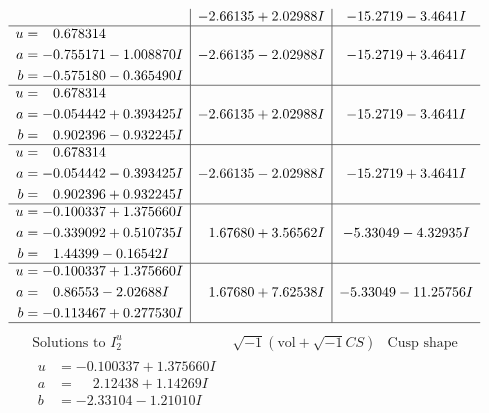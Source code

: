 \documentclass[1p]{elsarticle_modified}
\theoremstyle{definition}
\newcommand{\I}{\sqrt{-1}}
\begin{document}
$$\begin{array}{c|c|c}
 & -2.66135 + 2.02988 I & -15.2719 - 3.4641 I \\ \hline\begin{aligned}
u &= \phantom{-}0.678314\phantom{ +0.000000I} \\
a &= -0.755171 - 1.008870 I \\
b &= -0.575180 - 0.365490 I\end{aligned}
 & -2.66135 - 2.02988 I & -15.2719 + 3.4641 I \\ \hline\begin{aligned}
u &= \phantom{-}0.678314\phantom{ +0.000000I} \\
a &= -0.054442 + 0.393425 I \\
b &= \phantom{-}0.902396 - 0.932245 I\end{aligned}
 & -2.66135 + 2.02988 I & -15.2719 - 3.4641 I \\ \hline\begin{aligned}
u &= \phantom{-}0.678314\phantom{ +0.000000I} \\
a &= -0.054442 - 0.393425 I \\
b &= \phantom{-}0.902396 + 0.932245 I\end{aligned}
 & -2.66135 - 2.02988 I & -15.2719 + 3.4641 I \\ \hline\begin{aligned}
u &= -0.100337 + 1.375660 I \\
a &= -0.339092 + 0.510735 I \\
b &= \phantom{-}1.44399 - 0.16542 I\end{aligned}
 & \phantom{-}1.67680 + 3.56562 I & -5.33049 - 4.32935 I \\ \hline\begin{aligned}
u &= -0.100337 + 1.375660 I \\
a &= \phantom{-}0.86553 - 2.02688 I \\
b &= -0.113467 + 0.277530 I\end{aligned}
 & \phantom{-}1.67680 + 7.62538 I & -5.33049 - 11.25756 I\\
 \hline 
 \end{array}$$\newpage$$\begin{array}{c|c|c}  
\text{Solutions to }I^u_{2}& \I (\text{vol} + \sqrt{-1}CS) & \text{Cusp shape}\\
 \hline 
\begin{aligned}
u &= -0.100337 + 1.375660 I \\
a &= \phantom{-}2.12438 + 1.14269 I \\
b &= -2.33104 - 1.21010 I\end{aligned}

\end{array}$$
\end{document}
